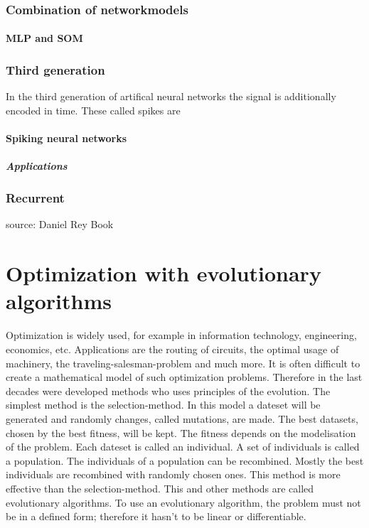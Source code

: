 \documentclass[10pt,a4paper,DIV=11]{scrreprt}
\begin{document}
\subsection{Combination of networkmodels}

\subsubsection{MLP and SOM} %

\subsection{Third generation}
In the third generation of artifical neural networks the signal is additionally encoded in time. These called spikes are

\subsubsection{Spiking neural networks}

\paragraph{Applications}

\subsection{Recurrent}


source: Daniel Rey Book




\chapter{Optimization with evolutionary algorithms}
Optimization is widely used, for example in information technology, engineering,
economics, etc. Applications are the routing of circuits, the optimal usage of machinery,
the traveling-salesman-problem and much more. It is often difficult to create a mathematical
model of such optimization problems. Therefore in the last decades were developed methods who
uses principles of the evolution.
The simplest method is the selection-method. In this model a dateset will be generated and randomly
changes, called mutations, are made. The best datasets, chosen by the best fitness, will be kept. The fitness depends on the modelisation of the problem.
Each dateset is called an individual. A set of individuals is called a population. The individuals
of a population can be recombined. Mostly the best individuals are recombined with randomly chosen
ones. This method is more effective than the selection-method. This and other methods are  called
evolutionary algorithms. To use an evolutionary algorithm, the problem must not be in a defined form;
therefore it hasn't to be linear or differentiable. \\
\end{document}
